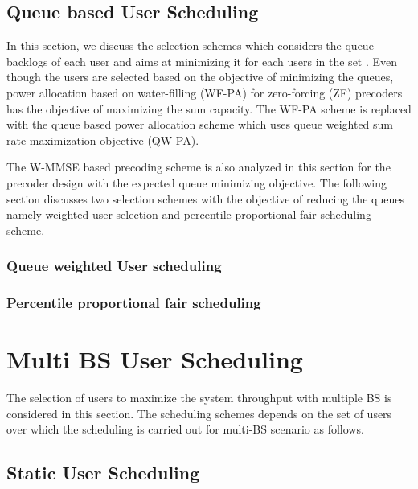 \documentclass[a4paper,11pt,draft,fleqn,onecolumn,draft]{article}
\begin{document}


\subsection{Queue based User Scheduling} \label{qbus}

In this section, we discuss the selection schemes which considers the queue backlogs of each user and aims at minimizing it for each users in the set . Even though the users are selected based on the objective of minimizing the queues, power allocation based on water-filling (WF-PA) for zero-forcing (ZF) precoders has the objective of maximizing the sum capacity. The WF-PA scheme is replaced with the queue based power allocation scheme which uses queue weighted sum rate maximization objective (QW-PA).

The W-MMSE based precoding scheme is also analyzed in this section for the precoder design with the expected queue minimizing objective. The following section discusses two selection schemes with the objective of reducing the queues namely weighted user selection and percentile proportional fair scheduling scheme.

\subsubsection{Queue weighted User scheduling} \label{weighted-queue-sched}



\subsubsection{Percentile proportional fair scheduling}



\section{Multi BS User Scheduling}

The selection of users to maximize the system throughput with multiple BS is considered in this section. The scheduling schemes depends on the set of users over which the scheduling is carried out for multi-BS scenario as follows.

\subsection{Static User Scheduling}
\end{document}
